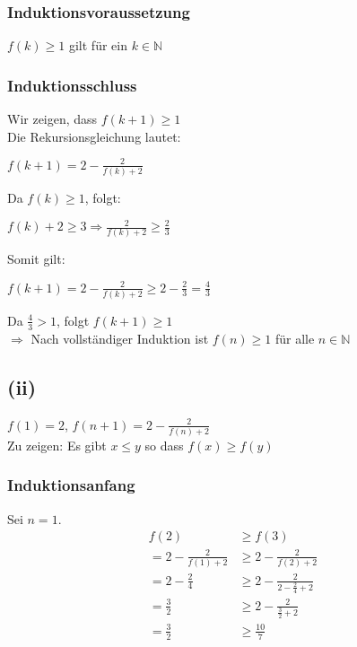 \documentclass{article}
\begin{document}
\subsubsection{Induktionsvoraussetzung}
\begin{center}
$f(k) \geq 1$ gilt für ein $k \in \mathbb{N}$ \\
\end{center}
\subsubsection{Induktionsschluss}
Wir zeigen, dass $f(k+1) \geq 1$ \\
Die Rekursionsgleichung lautet:\\
\begin{center}
$f(k+1) = 2- \frac{2}{f(k)+2}$ \\
\end{center}
Da $f(k) \geq 1$, folgt: \\
\begin{center}
$f(k)+2 \geq 3 \Longrightarrow \frac{2}{f(k)+2} \geq \frac{2}{3}$ \\
\end{center}
Somit gilt: \\
\begin{center}
$f(k+1)=2-\frac{2}{f(k)+2} \geq 2-\frac{2}{3} = \frac{4}{3}$ \\
\end{center}
Da $\frac{4}{3}>1$, folgt $f(k+1) \geq 1$ \\

$\Longrightarrow$ Nach vollständiger Induktion ist $f(n) \geq 1$ für alle $n \in \mathbb{N}$


\subsection{(ii)}
$f(1) = 2$, $f(n+1) = 2 - \frac{2}{f(n)+2}$ \\
\newline
Zu zeigen: Es gibt $x \leq y$ so dass $f(x) \geq f(y)$
\subsubsection{Induktionsanfang}
Sei $n = 1$.
\begin{align*}
    f(2) &\geq f(3) \\
    = 2 - \frac{2}{f(1) + 2} &\geq 2 - \frac{2}{f(2) + 2} \\
    = 2 - \frac{2}{4} &\geq 2 - \frac{2}{2- \frac{2}{4} + 2} \\
    = \frac{3}{2} &\geq 2 - \frac{2}{\frac{3}{2} + 2} \\
    = \frac{3}{2} &\geq \frac{10}{7}
\end{align*}
\end{document}

